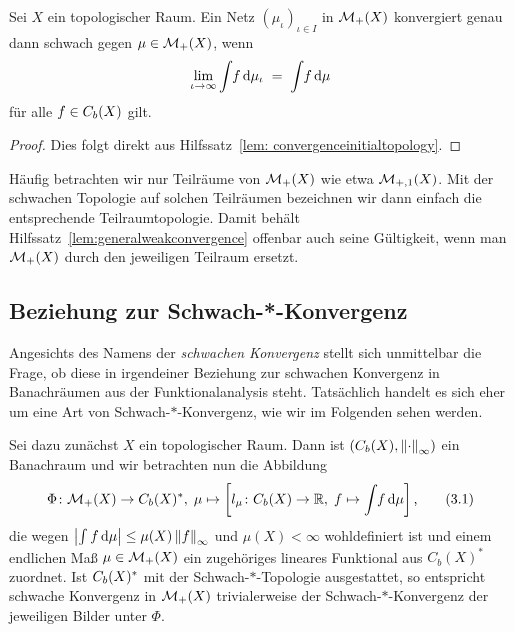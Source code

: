 \documentclass[../main/main.tex]{subfiles}
\begin{document}
	\begin{Hilfssatz}
		\label{lem:generalweakconvergence}
		Sei $X$ ein topologischer Raum. Ein Netz $(\mu_\iota)_{\iota \in I}$ in $\mathcal{M}_{+}(X)$ konvergiert genau dann schwach gegen $\mu \in \mathcal{M}_{+}(X)$, wenn
		\[ \lim_{\iota \to \infty} \int_{} \, f \, \mathrm{d}\mu_\iota \; = \; \int_{} \, f \, \mathrm{d}\mu \]
		für alle $f \in C_b(X)$ gilt.
	\end{Hilfssatz}

	\begin{proof}
		Dies folgt direkt aus Hilfssatz~\ref{lem: convergenceinitialtopology}.
	\end{proof}

	\begin{Bemerkung}
		Häufig betrachten wir nur Teilräume von $\mathcal{M}_{+}(X)$ wie etwa $\mathcal{M}_{+,1}(X)$. Mit der schwachen Topologie auf solchen Teilräumen bezeichnen wir 
		dann einfach die entsprechende Teilraumtopologie. Damit behält Hilfssatz~\ref{lem:generalweakconvergence} offenbar auch seine Gültigkeit, wenn man $\mathcal{M}_{+}(X)$ durch den 
		jeweiligen Teilraum ersetzt.
	\end{Bemerkung}

	\subsection{Beziehung zur Schwach-*-Konvergenz}
	\label{subsec:BeziehungSchwachStern}
	
	Angesichts des Namens der \emph{schwachen Konvergenz} stellt sich unmittelbar die Frage, ob diese in irgendeiner Beziehung zur schwachen Konvergenz in Banachräumen aus der 
	Funktionalanalysis steht. Tatsächlich handelt es sich eher um eine Art von Schwach-$\ast$-Konvergenz, wie wir im Folgenden sehen werden. 
	
	Sei dazu zunächst $X$ ein topologischer Raum. Dann ist $(C_b(X), \left\lVert\cdot\right\rVert_\infty)$ ein Banachraum und wir betrachten nun die Abbildung
	\[\Phi \colon \mathcal{M}_{+}(X) \to C_b(X)^\ast, \; \mu \mapsto \left[l_\mu \colon C_b(X) \to \mathbb{R}, \; f \mapsto \int_{} \, f \, \mathrm{d}\mu \right]  \text{,} \label{3.1} \tag{3.1}\]
	die wegen $\left| \int_{} \, f \, \mathrm{d}\mu \right| \leq \mu(X) \left\lVert f\right\rVert_\infty$ und $\mu(X) < \infty$ wohldefiniert ist 
	und einem endlichen Maß $\mu \in \mathcal{M}_{+}(X)$ ein zugehöriges lineares Funktional aus $C_b(X)^\ast$ zuordnet. 
	Ist $C_b(X)^\ast$ mit der 
	Schwach-$\ast$-Topologie ausgestattet, so entspricht schwache Konvergenz in $\mathcal{M}_{+}(X)$ trivialerweise der 
	Schwach-$\ast$-Konvergenz der jeweiligen Bilder unter $\Phi$.
	
\end{document}
